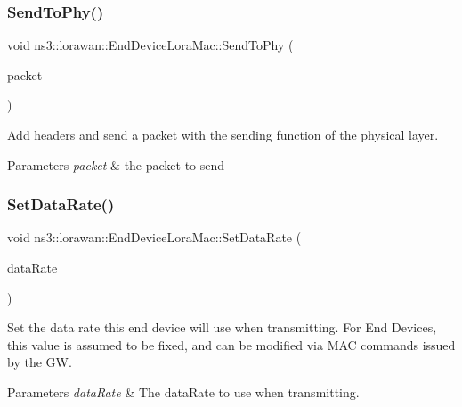 \subsubsection{\texorpdfstring{Send\+To\+Phy()}{SendToPhy()}}
{\footnotesize\ttfamily void ns3\+::lorawan\+::\+End\+Device\+Lora\+Mac\+::\+Send\+To\+Phy (\begin{DoxyParamCaption}\item[{Ptr$<$ Packet $>$}]{packet }\end{DoxyParamCaption})\hspace{0.3cm}{\ttfamily [virtual]}}

Add headers and send a packet with the sending function of the physical layer.


\begin{DoxyParams}{Parameters}
{\em packet} & the packet to send \\
\hline
\end{DoxyParams}
\mbox{\label{classns3_1_1lorawan_1_1EndDeviceLoraMac_a4c62f5aba7104a6935e74594d064028e}} 
\subsubsection{\texorpdfstring{Set\+Data\+Rate()}{SetDataRate()}}
{\footnotesize\ttfamily void ns3\+::lorawan\+::\+End\+Device\+Lora\+Mac\+::\+Set\+Data\+Rate (\begin{DoxyParamCaption}\item[{uint8\+\_\+t}]{data\+Rate }\end{DoxyParamCaption})}

Set the data rate this end device will use when transmitting. For End Devices, this value is assumed to be fixed, and can be modified via M\+AC commands issued by the GW.


\begin{DoxyParams}{Parameters}
{\em data\+Rate} & The data\+Rate to use when transmitting. \\
\hline
\end{DoxyParams}
\mbox{\label{classns3_1_1lorawan_1_1EndDeviceLoraMac_a32175f77b6b6386f5092a4800e6c41bb}} 
